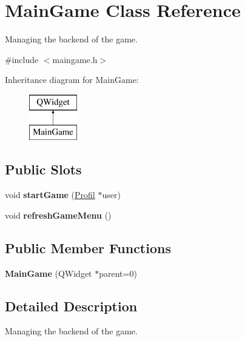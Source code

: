 \hypertarget{class_main_game}{}\section{Main\+Game Class Reference}
\label{class_main_game}


Managing the backend of the game.  




{\ttfamily \#include $<$maingame.\+h$>$}

Inheritance diagram for Main\+Game\+:\begin{figure}[H]
\begin{center}
\leavevmode
\includegraphics[height=2.000000cm]{class_main_game}
\end{center}
\end{figure}
\subsection*{Public Slots}
\begin{DoxyCompactItemize}
\item 
\hypertarget{class_main_game_aab3b497b7d0de1bcc87175895f477a9c}{}void {\bfseries start\+Game} (\hyperlink{class_profil}{Profil} $\ast$user)\label{class_main_game_aab3b497b7d0de1bcc87175895f477a9c}

\item 
\hypertarget{class_main_game_a21e0447f9ff6eeaa12d8abbd7c34aafe}{}void {\bfseries refresh\+Game\+Menu} ()\label{class_main_game_a21e0447f9ff6eeaa12d8abbd7c34aafe}

\end{DoxyCompactItemize}
\subsection*{Public Member Functions}
\begin{DoxyCompactItemize}
\item 
\hypertarget{class_main_game_aba77e63bf031bc452693ba06986affe6}{}{\bfseries Main\+Game} (Q\+Widget $\ast$parent=0)\label{class_main_game_aba77e63bf031bc452693ba06986affe6}

\end{DoxyCompactItemize}


\subsection{Detailed Description}
Managing the backend of the game. 

